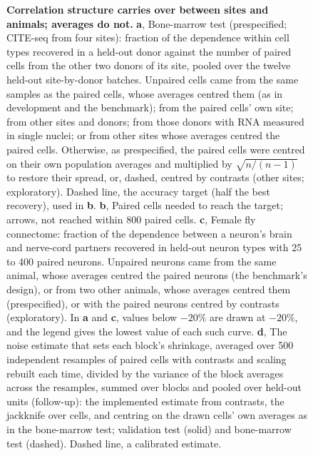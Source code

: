 \documentclass[10pt,a4paper]{article}
\begin{document}
\begin{figure}[p]
\centering

\caption{\textbf{Correlation structure carries over between sites and animals; averages do not.}
\textbf{a}, Bone-marrow test (prespecified; CITE-seq from four sites): fraction of the dependence within cell types recovered in a held-out donor against the number of paired cells from the other two donors of its site, pooled over the twelve held-out site-by-donor batches. Unpaired cells came from the same samples as the paired cells, whose averages centred them (as in development and the benchmark); from the paired cells' own site; from other sites and donors; from those donors with RNA measured in single nuclei; or from other sites whose averages centred the paired cells. Otherwise, as prespecified, the paired cells were centred on their own population averages and multiplied by $\sqrt{n/(n-1)}$ to restore their spread, or, dashed, centred by contrasts (other sites; exploratory). Dashed line, the accuracy target (half the best recovery), used in \textbf{b}.
\textbf{b}, Paired cells needed to reach the target; arrows, not reached within 800 paired cells.
\textbf{c}, Female fly connectome: fraction of the dependence between a neuron's brain and nerve-cord partners recovered in held-out neuron types with 25 to 400 paired neurons. Unpaired neurons came from the same animal, whose averages centred the paired neurons (the benchmark's design), or from two other animals, whose averages centred them (prespecified), or with the paired neurons centred by contrasts (exploratory). In \textbf{a} and \textbf{c}, values below $-20\%$ are drawn at $-20\%$, and the legend gives the lowest value of each such curve.
\textbf{d}, The noise estimate that sets each block's shrinkage, averaged over 500 independent resamples of paired cells with contrasts and scaling rebuilt each time, divided by the variance of the block averages across the resamples, summed over blocks and pooled over held-out units (follow-up): the implemented estimate from contrasts, the jackknife over cells, and centring on the drawn cells' own averages as in the bone-marrow test; validation test (solid) and bone-marrow test (dashed). Dashed line, a calibrated estimate.}
\label{sfig:transfer}
\end{figure}

\clearpage














\end{document}
